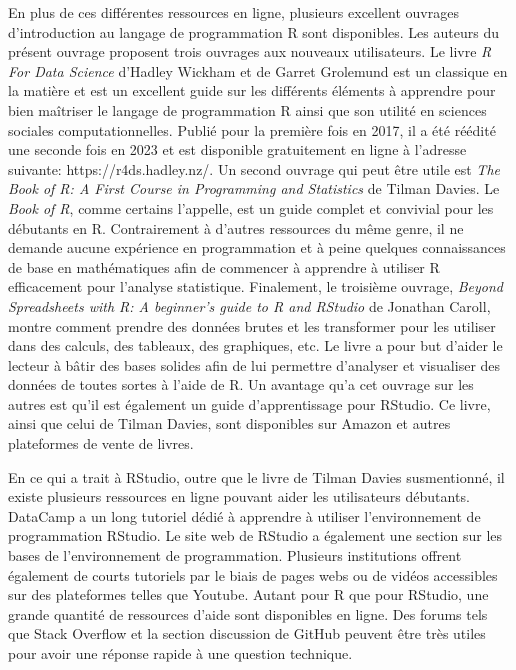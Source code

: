 \documentclass[
  letterpaper,
]{scrbook}
\begin{document}
En plus de ces différentes ressources en ligne, plusieurs excellent
ouvrages d'introduction au langage de programmation R sont disponibles.
Les auteurs du présent ouvrage proposent trois ouvrages aux nouveaux
utilisateurs. Le livre \emph{R For Data Science} d'Hadley Wickham et de
Garret Grolemund est un classique en la matière et est un excellent
guide sur les différents éléments à apprendre pour bien maîtriser le
langage de programmation R ainsi que son utilité en sciences sociales
computationnelles. Publié pour la première fois en 2017, il a été
réédité une seconde fois en 2023 et est disponible gratuitement en ligne
à l'adresse suivante: https://r4ds.hadley.nz/. Un second ouvrage qui
peut être utile est \emph{The Book of R: A First Course in Programming
and Statistics} de Tilman Davies. Le \emph{Book of R}, comme certains
l'appelle, est un guide complet et convivial pour les débutants en R.
Contrairement à d'autres ressources du même genre, il ne demande aucune
expérience en programmation et à peine quelques connaissances de base en
mathématiques afin de commencer à apprendre à utiliser R efficacement
pour l'analyse statistique. Finalement, le troisième ouvrage,
\emph{Beyond Spreadsheets with R: A beginner's guide to R and RStudio}
de Jonathan Caroll, montre comment prendre des données brutes et les
transformer pour les utiliser dans des calculs, des tableaux, des
graphiques, etc. Le livre a pour but d'aider le lecteur à bâtir des
bases solides afin de lui permettre d'analyser et visualiser des données
de toutes sortes à l'aide de R. Un avantage qu'a cet ouvrage sur les
autres est qu'il est également un guide d'apprentissage pour RStudio. Ce
livre, ainsi que celui de Tilman Davies, sont disponibles sur Amazon et
autres plateformes de vente de livres.

En ce qui a trait à RStudio, outre que le livre de Tilman Davies
susmentionné, il existe plusieurs ressources en ligne pouvant aider les
utilisateurs débutants. DataCamp a un long tutoriel dédié à apprendre à
utiliser l'environnement de programmation RStudio. Le site web de
RStudio a également une section sur les bases de l'environnement de
programmation. Plusieurs institutions offrent également de courts
tutoriels par le biais de pages webs ou de vidéos accessibles sur des
plateformes telles que Youtube. Autant pour R que pour RStudio, une
grande quantité de ressources d'aide sont disponibles en ligne. Des
forums tels que Stack Overflow et la section discussion de GitHub
peuvent être très utiles pour avoir une réponse rapide à une question
technique.
\end{document}
